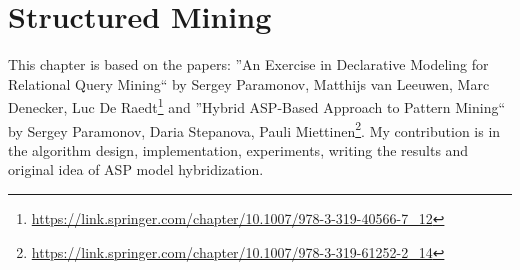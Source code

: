\chapter{Structured Mining}\label{ch:StructuredMining}
This chapter is based on the papers: ''An Exercise in Declarative Modeling for Relational Query Mining`` by Sergey Paramonov, Matthijs van Leeuwen, Marc Denecker, Luc De Raedt\footnote{\url{https://link.springer.com/chapter/10.1007/978-3-319-40566-7_12}} and ''Hybrid ASP-Based Approach to Pattern Mining`` by Sergey Paramonov, Daria Stepanova, Pauli Miettinen\footnote{\url{https://link.springer.com/chapter/10.1007/978-3-319-61252-2_14}}. My contribution is in the algorithm design, implementation, experiments, writing the results and original idea of ASP model hybridization.

\newcommand{\revision}[1]{#1\xspace}
%
%













\cleardoublepage
